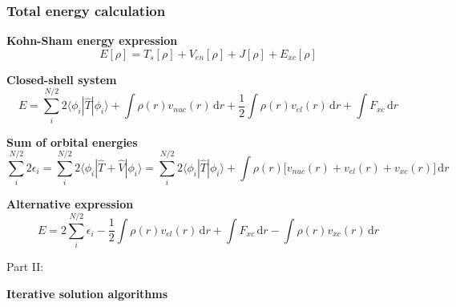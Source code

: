 \documentclass[mathserif, 10pt]{beamer}
\newcommand{\ud}{\ensuremath{\,\mathrm{d}}}
\begin{document}
\begin{frame}
    \frametitle{Total energy calculation}
    \centering
    \textbf{Kohn-Sham energy expression}
    \begin{equation}
        \nonumber
        E[\rho] = T_s[\rho] + V_{en}[\rho] + J[\rho] + E_{xc}[\rho]
    \end{equation}

    \vspace{3mm}

    \textbf{Closed-shell system}
    \begin{equation}
        \nonumber
        E = \sum_i^{N/2} 2\langle \phi_i|\hat{T}|\phi_i \rangle
	    + \int \rho(r)v_{nuc}(r) \ud r
	    + \frac{1}{2} \int \rho(r)v_{el}(r) \ud r
	    + \int F_{xc} \ud r
    \end{equation}

    \vspace{3mm}

    \textbf{Sum of orbital energies}
    \begin{equation}
        \nonumber
        \sum_i^{N/2} 2\epsilon_i 
	    = \sum_i^{N/2} 2\langle\phi_i|\hat{T} + \hat{V}|\phi_i\rangle
	    = \sum_i^{N/2} 2\langle\phi_i|\hat{T}|\phi_i\rangle
	        + \int \rho(r)\Big[v_{nuc}(r)+v_{el}(r)+v_{xc}(r)\Big] \ud r
    \end{equation}

    \vspace{3mm}

    \textbf{Alternative expression}
    \begin{equation}
        \nonumber
        E = 2 \sum_i^{N/2} \epsilon_i - \frac{1}{2} \int \rho(r)v_{el}(r) \ud r
	    + \int F_{xc} \ud r - \int \rho(r)v_{xc}(r) \ud r
    \end{equation}
\end{frame}

\begin{frame}
    \centering
    \Large{Part II:}
    
    \vspace{5mm}

    \centering
    \textbf{\Large{Iterative solution algorithms}}
\end{frame}
\end{document}
